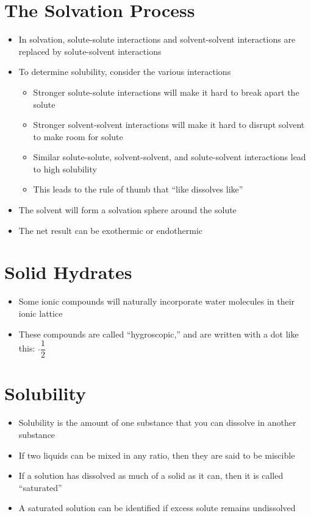 \documentclass[12pt, openany, letterpaper]{memoir}
\begin{document}
\section{The Solvation Process}
\begin{itemize}
	\item In solvation, solute-solute interactions and solvent-solvent interactions are replaced by solute-solvent interactions
	\item To determine solubility, consider the various interactions
	      \begin{itemize}
		      \item Stronger solute-solute interactions will make it hard to break apart the solute
		      \item Stronger solvent-solvent interactions will make it hard to disrupt solvent to make room for solute
		      \item Similar solute-solute, solvent-solvent, and solute-solvent interactions lead to high solubility
		      \item This leads to the rule of thumb that ``like dissolves like''
	      \end{itemize}
	\item The solvent will form a solvation sphere around the solute
	\item The net result can be exothermic or endothermic
\end{itemize}
\section{Solid Hydrates}
\begin{itemize}
	\item Some ionic compounds will naturally incorporate water molecules in their ionic lattice
	\item These compounds are called ``hygroscopic,'' and are written with a dot like this: $\cdot \dfrac{1}{2}$ 
\end{itemize}
\section{Solubility}
\begin{itemize}
	\item Solubility is the amount of one substance that you can dissolve in another substance
	\item If two liquids can be mixed in any ratio, then they are said to be miscible
	\item If a solution has dissolved as much of a solid as it can, then it is called ``saturated''
	\item A saturated solution can be identified if excess solute remains undissolved
\end{itemize}
\end{document}
